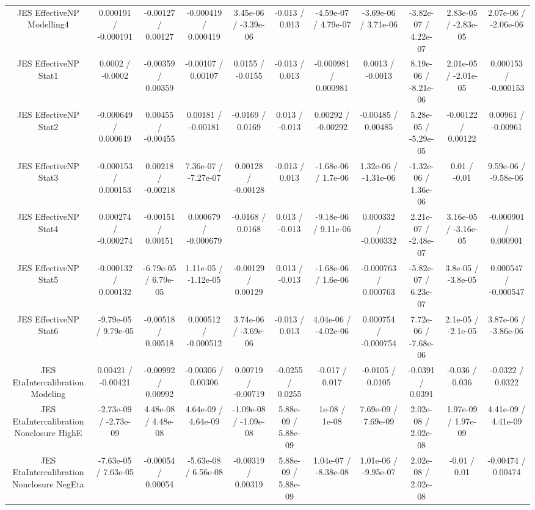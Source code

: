 \begin{table}[htbp]
\begin{center}
\begin{tabular}{|c|c|c|c|c|c|c|c|c|c|c|}
  JES EffectiveNP Modelling4 & 0.000191 / -0.000191 & -0.00127 / 0.00127 & -0.000419 / 0.000419 & 3.45e-06 / -3.39e-06 & -0.013 / 0.013 & -4.59e-07 / 4.79e-07 & -3.69e-06 / 3.71e-06 & -3.82e-07 / 4.22e-07 & 2.83e-05 / -2.83e-05 & 2.07e-06 / -2.06e-06 \\ 
  JES EffectiveNP Stat1 & 0.0002 / -0.0002 & -0.00359 / 0.00359 & -0.00107 / 0.00107 & 0.0155 / -0.0155 & -0.013 / 0.013 & -0.000981 / 0.000981 & 0.0013 / -0.0013 & 8.19e-06 / -8.21e-06 & 2.01e-05 / -2.01e-05 & 0.000153 / -0.000153 \\ 
  JES EffectiveNP Stat2 & -0.000649 / 0.000649 & 0.00455 / -0.00455 & 0.00181 / -0.00181 & -0.0169 / 0.0169 & 0.013 / -0.013 & 0.00292 / -0.00292 & -0.00485 / 0.00485 & 5.28e-05 / -5.29e-05 & -0.00122 / 0.00122 & 0.00961 / -0.00961 \\ 
  JES EffectiveNP Stat3 & -0.000153 / 0.000153 & 0.00218 / -0.00218 & 7.36e-07 / -7.27e-07 & 0.00128 / -0.00128 & -0.013 / 0.013 & -1.68e-06 / 1.7e-06 & 1.32e-06 / -1.31e-06 & -1.32e-06 / 1.36e-06 & 0.01 / -0.01 & 9.59e-06 / -9.58e-06 \\ 
  JES EffectiveNP Stat4 & 0.000274 / -0.000274 & -0.00151 / 0.00151 & 0.000679 / -0.000679 & -0.0168 / 0.0168 & 0.013 / -0.013 & -9.18e-06 / 9.11e-06 & 0.000332 / -0.000332 & 2.21e-07 / -2.48e-07 & 3.16e-05 / -3.16e-05 & -0.000901 / 0.000901 \\ 
  JES EffectiveNP Stat5 & -0.000132 / 0.000132 & -6.79e-05 / 6.79e-05 & 1.11e-05 / -1.12e-05 & -0.00129 / 0.00129 & 0.013 / -0.013 & -1.68e-06 / 1.6e-06 & -0.000763 / 0.000763 & -5.82e-07 / 6.23e-07 & 3.8e-05 / -3.8e-05 & 0.000547 / -0.000547 \\ 
  JES EffectiveNP Stat6 & -9.79e-05 / 9.79e-05 & -0.00518 / 0.00518 & 0.000512 / -0.000512 & 3.74e-06 / -3.69e-06 & -0.013 / 0.013 & 4.04e-06 / -4.02e-06 & 0.000754 / -0.000754 & 7.72e-06 / -7.68e-06 & 2.1e-05 / -2.1e-05 & 3.87e-06 / -3.86e-06 \\ 
  JES EtaIntercalibration Modeling & 0.00421 / -0.00421 & -0.00992 / 0.00992 & -0.00306 / 0.00306 & 0.00719 / -0.00719 & -0.0255 / 0.0255 & -0.017 / 0.017 & -0.0105 / 0.0105 & -0.0391 / 0.0391 & -0.036 / 0.036 & -0.0322 / 0.0322 \\ 
  JES EtaIntercalibration Nonclosure HighE & -2.73e-09 / -2.73e-09 & 4.48e-08 / 4.48e-08 & 4.64e-09 / 4.64e-09 & -1.09e-08 / -1.09e-08 & 5.88e-09 / 5.88e-09 & 1e-08 / 1e-08 & 7.69e-09 / 7.69e-09 & 2.02e-08 / 2.02e-08 & 1.97e-09 / 1.97e-09 & 4.41e-09 / 4.41e-09 \\ 
  JES EtaIntercalibration Nonclosure NegEta & -7.63e-05 / 7.63e-05 & -0.00054 / 0.00054 & -5.63e-08 / 6.56e-08 & -0.00319 / 0.00319 & 5.88e-09 / 5.88e-09 & 1.04e-07 / -8.38e-08 & 1.01e-06 / -9.95e-07 & 2.02e-08 / 2.02e-08 & -0.01 / 0.01 & -0.00474 / 0.00474 \\ 

\end{tabular}
\end{center}
\end{table}

